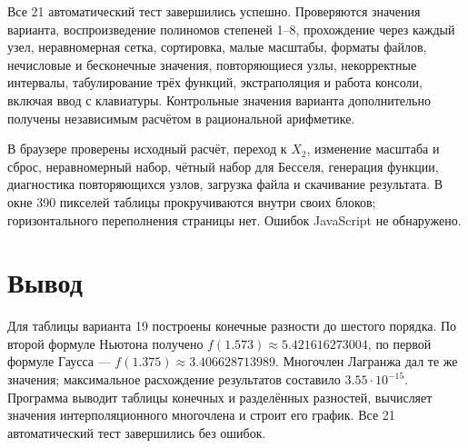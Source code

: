 \documentclass[12pt,a4paper]{article}
\begin{document}
Все 21 автоматический тест завершились успешно. Проверяются значения варианта,
воспроизведение полиномов степеней 1--8, прохождение через каждый узел,
неравномерная сетка, сортировка, малые масштабы, форматы файлов,
нечисловые и бесконечные значения, повторяющиеся узлы, некорректные интервалы,
табулирование трёх функций, экстраполяция и работа консоли, включая ввод с клавиатуры.
Контрольные значения варианта дополнительно получены независимым расчётом
в рациональной арифметике.

В браузере проверены исходный расчёт, переход к $X_2$, изменение масштаба
и сброс, неравномерный набор, чётный набор для Бесселя, генерация функции,
диагностика повторяющихся узлов, загрузка файла и скачивание результата.
В окне 390 пикселей таблицы прокручиваются внутри своих блоков;
горизонтального переполнения страницы нет. Ошибок JavaScript не обнаружено.

\clearpage
\section{Вывод}
Для таблицы варианта 19 построены конечные разности до шестого порядка.
По второй формуле Ньютона получено $f(1.573)\approx5.421616273004$,
по первой формуле Гаусса --- $f(1.375)\approx3.406628713989$.
Многочлен Лагранжа дал те же значения; максимальное расхождение результатов
составило $3.55\cdot10^{-15}$. Программа выводит таблицы конечных и разделённых
разностей, вычисляет значения интерполяционного многочлена и строит его график.
Все 21 автоматический тест завершились без ошибок.
\end{document}

